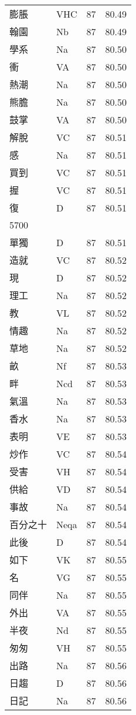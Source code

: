 \documentclass[twocolumn]{book}
\begin{document}
\begin{supertabular}{llrr}
膨脹 & VHC & 87 &  80.49\\
翰園 & Nb & 87 &  80.49\\
學系 & Na & 87 &  80.50\\
衝 & VA & 87 &  80.50\\
熱潮 & Na & 87 &  80.50\\
熊膽 & Na & 87 &  80.50\\
鼓掌 & VA & 87 &  80.50\\
解脫 & VC & 87 &  80.51\\
感 & Na & 87 &  80.51\\
買到 & VC & 87 &  80.51\\
握 & VC & 87 &  80.51\\
復 & D & 87 &  80.51\\
5700\\
單獨 & D & 87 &  80.51\\
造就 & VC & 87 &  80.52\\
現 & D & 87 &  80.52\\
理工 & Na & 87 &  80.52\\
教 & VL & 87 &  80.52\\
情趣 & Na & 87 &  80.52\\
草地 & Na & 87 &  80.52\\
畝 & Nf & 87 &  80.53\\
畔 & Ncd & 87 &  80.53\\
氣溫 & Na & 87 &  80.53\\
香水 & Na & 87 &  80.53\\
表明 & VE & 87 &  80.53\\
炒作 & VC & 87 &  80.54\\
受害 & VH & 87 &  80.54\\
供給 & VD & 87 &  80.54\\
事故 & Na & 87 &  80.54\\
百分之十 & Neqa & 87 &  80.54\\
此後 & D & 87 &  80.54\\
如下 & VK & 87 &  80.55\\
名 & VG & 87 &  80.55\\
同伴 & Na & 87 &  80.55\\
外出 & VA & 87 &  80.55\\
半夜 & Nd & 87 &  80.55\\
匆匆 & VH & 87 &  80.55\\
出路 & Na & 87 &  80.56\\
日趨 & D & 87 &  80.56\\
日記 & Na & 87 &  80.56\\

\end{supertabular}
\end{document}

